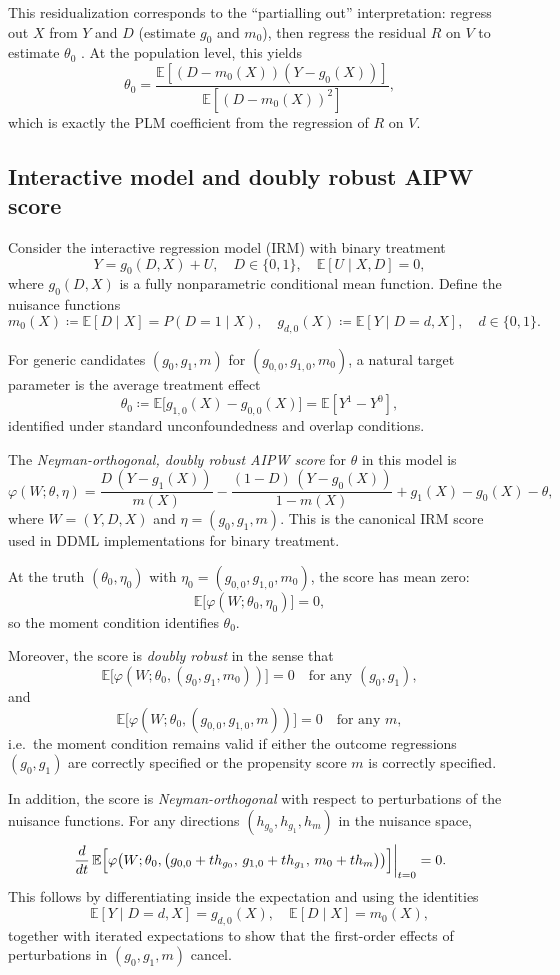 \documentclass [11pt]{article}
\theoremstyle{plain}
\theoremstyle{definition}
\theoremstyle{remark}
\newcommand{\1}{\bm{1}}
\newcommand{\E}{\mathbb{E}}
\begin{document}
\begin{appendices}
This residualization corresponds to the ``partialling out'' interpretation: regress out $X$ from $Y$ and $D$ (estimate $g_0$ and $m_0$), then regress the residual $R$ on $V$ to estimate $\theta_0$ \citep[Fig.~1c]{doubleml2022}. At the population level, this yields
\[
\theta_0 = \frac{\E[(D-m_0(X))(Y-g_0(X))]}{\E[(D-m_0(X))^2]},
\]
which is exactly the PLM coefficient from the regression of $R$ on $V$.

\subsection{Interactive model and doubly robust AIPW score}
\label{sec:theory_irm}

Consider the interactive regression model (IRM) with binary treatment
\[
Y = g_0(D,X) + U,\quad D \in \{0,1\},\quad \E[U \mid X,D] = 0,
\]
where \(g_0(D,X)\) is a fully nonparametric conditional mean function.
Define the nuisance functions
\[
m_0(X) \coloneqq \E[D \mid X] = P(D=1 \mid X),\quad g_{d,0}(X) \coloneqq \E[Y \mid D=d,X],\quad d \in \{0,1\}.
\]

For generic candidates \((g_0,g_1,m)\) for \((g_{0,0},g_{1,0},m_0)\), a natural target parameter is the average treatment effect
\[
\theta_0 \coloneqq \E\bigl[g_{1,0}(X) - g_{0,0}(X)\bigr] = \E[Y^1 - Y^0],
\]
identified under standard unconfoundedness and overlap conditions.

The \emph{Neyman-orthogonal, doubly robust AIPW score} for \(\theta\) in this model is
\[
\varphi(W; \theta, \eta) = \frac{D\,(Y - g_1(X))}{m(X)} - \frac{(1-D)\,(Y - g_0(X))}{1 - m(X)} + g_1(X) - g_0(X) - \theta,
\]
where \(W = (Y,D,X)\) and \(\eta = (g_0,g_1,m)\).
This is the canonical IRM score used in DDML implementations for binary treatment.

At the truth \((\theta_0,\eta_0)\) with \(\eta_0 = (g_{0,0},g_{1,0},m_0)\), the score has mean zero:
\[
\E\bigl[\varphi(W; \theta_0, \eta_0)\bigr] = 0,
\]
so the moment condition identifies \(\theta_0\).

Moreover, the score is \emph{doubly robust} in the sense that
\[
\E\bigl[\varphi(W; \theta_0, (g_0,g_1,m_0))\bigr] = 0 \quad\text{for any } (g_0,g_1),
\]
and
\[
\E\bigl[\varphi(W; \theta_0, (g_{0,0},g_{1,0},m))\bigr] = 0 \quad\text{for any } m,
\]
i.e.\ the moment condition remains valid if either the outcome regressions \((g_0,g_1)\) are correctly specified or the propensity score \(m\) is correctly specified.

In addition, the score is \emph{Neyman-orthogonal} with respect to perturbations of the nuisance functions.
For any directions \((h_{g_0},h_{g_1},h_m)\) in the nuisance space,
\[
\left. \frac{d}{dt}\, \E\Bigl[ \varphi\bigl( W;\theta_0,\bigl(g_{0,0} + t h_{g_0},\, g_{1,0} + t h_{g_1},\, m_0 + t h_m\bigr) \bigr) \Bigr] \right|_{t=0} = 0.
\]
This follows by differentiating inside the expectation and using the identities
\[
\E[Y \mid D=d,X] = g_{d,0}(X),\quad \E[D \mid X] = m_0(X),
\]
together with iterated expectations to show that the first-order effects of perturbations in \((g_0,g_1,m)\) cancel.


\end{appendices}
\end{document}
